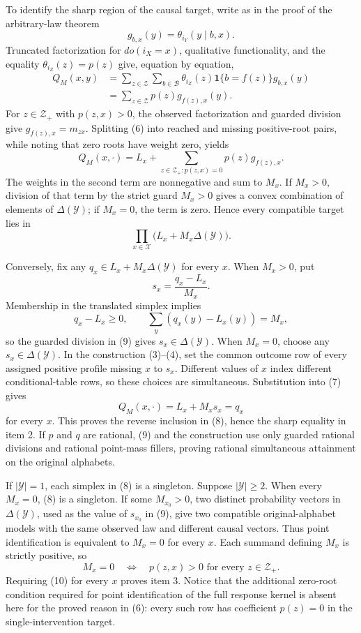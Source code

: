 To identify the sharp region of the causal target, write as in the proof
of the arbitrary-law theorem
\[
 g_{b,x}(y)=\theta_{i_Y}(y\mid b,x).
\]
Truncated factorization for \(do(i_X=x)\), qualitative functionality, and
the equality \(\theta_{i_Z}(z)=p(z)\) give, equation by equation,
\[
\begin{aligned}
 Q_M(x,y)
 &=\sum_{z\in\mathcal Z}\sum_{b\in\mathcal B}
   \theta_{i_Z}(z)\mathbf 1\{b=f(z)\}g_{b,x}(y)\\
 &=\sum_{z\in\mathcal Z}p(z)g_{f(z),x}(y).
\end{aligned}
\tag{6}
\]
For \(z\in\mathcal Z_+\) with \(p(z,x)>0\), the observed factorization
and guarded division give \(g_{f(z),x}=m_{zx}\).  Splitting (6) into
reached and missing positive-root pairs, while noting that zero roots have
weight zero, yields
\[
 Q_M(x,\cdot)
 =L_x+
 \sum_{z\in\mathcal Z_+:p(z,x)=0}p(z)g_{f(z),x}.
\tag{7}
\]
The weights in the second term are nonnegative and sum to \(M_x\).  If
\(M_x>0\), division of that term by the strict guard \(M_x>0\) gives a
convex combination of elements of \(\Delta(\mathcal Y)\); if
\(M_x=0\), the term is zero.  Hence every compatible target lies in
\[
 \prod_{x\in\mathcal X}\bigl(L_x+M_x\Delta(\mathcal Y)\bigr).
\tag{8}
\]

Conversely, fix any \(q_x\in L_x+M_x\Delta(\mathcal Y)\) for every
\(x\).  When \(M_x>0\), put
\[
 s_x=\frac{q_x-L_x}{M_x}.
\tag{9}
\]
Membership in the translated simplex implies
\[
 q_x-L_x\geq0,
 \qquad
 \sum_y(q_x(y)-L_x(y))=M_x,
\]
so the guarded division in (9) gives
\(s_x\in\Delta(\mathcal Y)\).  When \(M_x=0\), choose any
\(s_x\in\Delta(\mathcal Y)\).  In the construction (3)--(4), set the
common outcome row of every assigned positive profile missing \(x\) to
\(s_x\).  Different values of \(x\) index different conditional-table
rows, so these choices are simultaneous.  Substitution into (7) gives
\[
 Q_M(x,\cdot)=L_x+M_xs_x=q_x
\]
for every \(x\).  This proves the reverse inclusion in (8), hence the
sharp equality in item 2.  If \(p\) and \(q\) are rational, (9) and the
construction use only guarded rational divisions and rational point-mass
fillers, proving rational simultaneous attainment on the original
alphabets.

If \(|\mathcal Y|=1\), each simplex in (8) is a singleton.  Suppose
\(|\mathcal Y|\geq2\).  When every \(M_x=0\), (8) is a singleton.  If
some \(M_{x_0}>0\), two distinct probability vectors in
\(\Delta(\mathcal Y)\), used as the value of \(s_{x_0}\) in (9), give
two compatible original-alphabet models with the same observed law and
different causal vectors.  Thus point identification is equivalent to
\(M_x=0\) for every \(x\).  Each summand defining \(M_x\) is strictly
positive, so
\[
 M_x=0
 \quad\Longleftrightarrow\quad
 p(z,x)>0\text{ for every }z\in\mathcal Z_+.
\tag{10}
\]
Requiring (10) for every \(x\) proves item 3.  Notice that the additional
zero-root condition required for point identification of the full
response kernel is absent here for the proved reason in (6): every such
row has coefficient \(p(z)=0\) in the single-intervention target.

